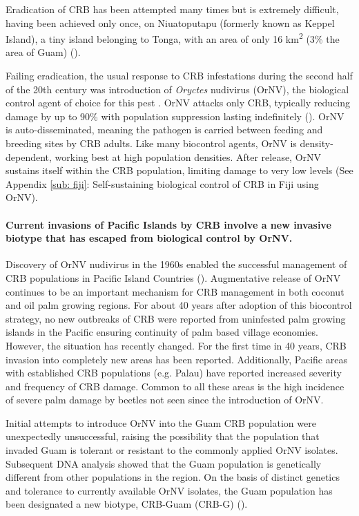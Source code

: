 \documentclass[12pt,letterpaper,english,bibliography=totocnumbered, abstract=on]{scrartcl}
\begin{document}
Eradication of CRB has been attempted many times but is extremely
difficult, having been achieved only once, on Niuatoputapu (formerly
known as Keppel Island), a tiny island belonging to Tonga, with an
area of only 16 km\textsuperscript{2} (3\% the area of Guam) (\cite{catley_coconut_1969}).

Failing eradication, the usual response to CRB infestations during
the second half of the 20th century was introduction of \emph{Oryctes}
nudivirus (OrNV), the biological control agent of choice for this
pest \cite{jackson_use_2009-1} . OrNV attacks only CRB, typically
reducing damage by up to 90\% with population suppression lasting
indefinitely (\cite{bedford_g._o._long-term_2013}). OrNV is auto-disseminated,
meaning the pathogen is carried between feeding and breeding sites
by CRB adults. Like many biocontrol agents, OrNV is density-dependent,
working best at high population densities. After release, OrNV sustains itself within the 
CRB population, limiting damage to very low levels (See Appendix \ref{sub: fiji}: Self-sustaining biological control of CRB in Fiji using OrNV). 

\paragraph*{Current invasions of Pacific Islands by CRB involve a new invasive
biotype that has escaped from biological control by OrNV. }

Discovery of OrNV nudivirus in the 1960s enabled the successful management
of CRB populations in Pacific Island Countries (\cite{huger_oryctes_2005-1}).
Augmentative release of OrNV continues to be an important mechanism
for CRB management in both coconut and oil palm growing regions. For
about 40 years after adoption of this biocontrol strategy,
no new outbreaks of CRB were reported from uninfested palm growing
islands in the Pacific ensuring continuity of palm based village economies. 
However, the situation has recently changed. For the first time in
40 years, CRB invasion into completely new areas has been reported.
Additionally, Pacific areas with established CRB populations (e.g.
Palau) have reported increased severity and frequency of CRB damage.
Common to all these areas is the high incidence of severe palm damage
by beetles not seen since the introduction of OrNV. 

Initial attempts to introduce OrNV into the Guam CRB population were
unexpectedly unsuccessful, raising the possibility that the population
that invaded Guam is tolerant or resistant to the commonly applied
OrNV isolates. Subsequent DNA analysis showed that the Guam population
is genetically different from other populations in the region. On
the basis of distinct genetics and tolerance to currently available
OrNV isolates, the Guam population has been designated a new biotype,
CRB-Guam (CRB-G) (\cite{marshall_new_2015,marshall_new_2017-1}).
\end{document}
